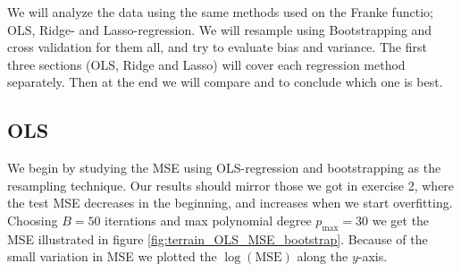 \documentclass[reprint,english,notitlepage,aps,nobalancelastpage,nofootinbib]{revtex4-1}  %
\begin{document}
We will analyze the data using the same methods used on the Franke functio; OLS, Ridge- and Lasso-regression. We will resample using Bootstrapping and cross validation for them all, and try to evaluate bias and variance. The first three sections (OLS, Ridge and Lasso) will cover each regression method separately. Then at the end we will compare and to conclude which one is best.

\subsection*{OLS}
We begin by studying the MSE using OLS-regression and bootstrapping as the resampling technique. Our results should mirror those we got in exercise 2, where the test MSE decreases in the beginning, and increases when we start overfitting. Choosing $B = 50$ iterations and max polynomial degree $p_\text{max} = 30$ we get the MSE illustrated in figure \ref{fig:terrain_OLS_MSE_bootstrap}. Because of the small variation in MSE we plotted the $\log(\text{MSE})$ along the $y$-axis.
\end{document}

